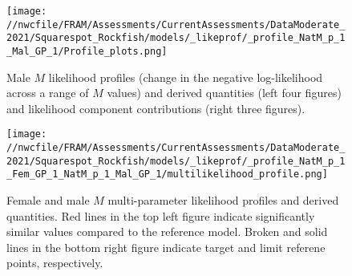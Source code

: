 \documentclass[11pt,
  english,
  a4paper,
]{article}
\begin{document}
\tagmcend\tagstructend


\begin{figure}
\centering
\texttt{[image: //nwcfile/FRAM/Assessments/CurrentAssessments/DataModerate\_2021/Squarespot\_Rockfish/models/\_likeprof/\_profile\_NatM\_p\_1\_Mal\_GP\_1/Profile\_plots.png]}
\caption{Male {\(M\)\leavevmode\tagmcend\tagstructend} likelihood profiles (change in the negative log-likelihood across a range of {\(M\)\leavevmode\tagmcend\tagstructend} values) and derived quantities (left four figures) and likelihood component contributions (right three figures).\label{fig:M_m-profile-combo}}
\end{figure}

\tagmcend\tagstructend


\begin{figure}
\centering
\texttt{[image: //nwcfile/FRAM/Assessments/CurrentAssessments/DataModerate\_2021/Squarespot\_Rockfish/models/\_likeprof/\_profile\_NatM\_p\_1\_Fem\_GP\_1\_NatM\_p\_1\_Mal\_GP\_1/multilikelihood\_profile.png]}
\caption{Female and male {\(M\)\leavevmode\tagmcend\tagstructend} multi-parameter likelihood profiles and derived quantities. Red lines in the top left figure indicate significantly similar values compared to the reference model. Broken and solid lines in the bottom right figure indicate target and limit referene points, respectively.\label{fig:M-multiprofile-combo}}
\end{figure}

\tagmcend\tagstructend

\end{document}
